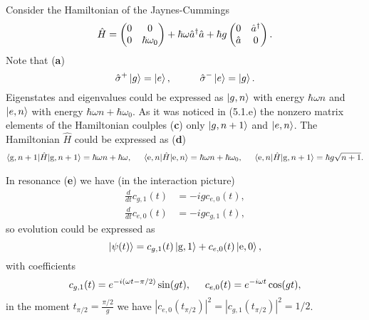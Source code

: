 Consider the Hamiltonian of the Jaynes-Cummings
\begin{equation*}
	\hat{H} = \begin{pmatrix}
	    0 & 0 \\
	    0 & \hbar \omega_0  \\
	\end{pmatrix}
	+ \hbar \omega \hat{a}^{\dag} \hat{a} + \hbar g \begin{pmatrix}
	    0 & \hat{a}^{\dag} \\
	    \hat{a} & 0 \\
	\end{pmatrix}.
\end{equation*}
Note that  (\textbf{a})
\begin{equation*}
	\hat{\sigma}^+ \ket{g} = \ket{e},
	\hspace{10 mm} 
	\hat{\sigma}^- \ket{e} = \ket{g}.
\end{equation*}
Eigenstates and eigenvalues could be expressed as $\left| g,n \right\rangle$ with energy $\hbar \omega n$ and $\left| e,n \right\rangle$ with energy $\hbar \omega n + \hbar \omega_0$. As it was noticed in (5.1.e) the nonzero matrix elements of the Hamiltonian coulples (\textbf{c}) only $\left| g,n+1 \right\rangle$ and $\left| e, n \right\rangle$. The Hamiltonian $\hat{H}$ could be expressed as (\textbf{d})
\begin{align*}
	\bk{\text{g},n+1}[\hat{H}]{\text{g}, n+1} = \hbar \omega n+ \hbar \omega,
	\hspace{5 mm} 
	\bk{\text{e}, n}[\hat{H}]{\text{e}, n} = \hbar \omega n + \hbar \omega_0,
	\hspace{5 mm} 
	\bk{\text{e}, n}[\hat{H}]{\text{g}, n+1} = \hbar g \sqrt{n+1}.
\end{align*}

In resonance (\textbf{e}) we have (in the interaction picture)
\begin{align*}
	\tfrac{d }{d t} c_{g, 1}(t) &= - i g   c_{e, 0}(t),\\
	    \tfrac{d }{d t} c_{e, 0}(t) &= - i g   c_{g, 1}(t),
\end{align*}
so evolution could be expressed as
\begin{equation*}
	\left| \psi(t) \right\rangle =  c_{g, 1}(t) \left| \text{g}, 1 \right\rangle + c_{e, 0}(t) \left| \text{e}, 0 \right\rangle,
\end{equation*}
with coefficients 
\begin{equation*}
	 c_{g, 1}(t) = e^{-i (\omega t-\pi/2)} \sin(g t),
	\hspace{5 mm} 
	c_{e,0}(t) = e^{-i \omega t} \cos(g t),
\end{equation*}
in the moment $t_{\pi/2}=\frac{\pi/2}{g}$ we have $|c_{e,0}(t_{\pi/2})|^2=|c_{g,1}(t_{\pi/2})|^2=1/2$.